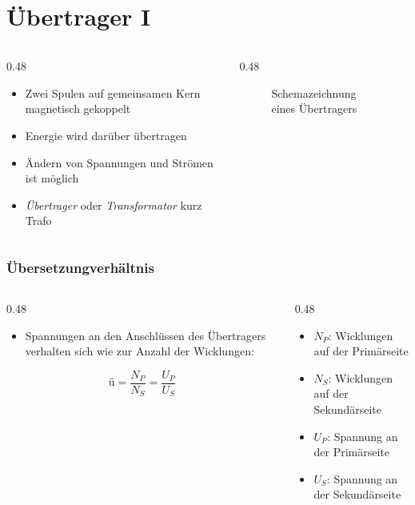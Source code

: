 
\section{Übertrager I}
\label{section:uebertrager_1}
\begin{frame}%

\begin{columns}
    \begin{column}{0.48\textwidth}
    \begin{itemize}
  \item Zwei Spulen auf gemeinsamen Kern magnetisch gekoppelt
  \item Energie wird darüber übertragen
  \item Ändern von Spannungen und Strömen ist möglich
  \item \emph{Übertrager} oder \emph{Transformator} kurz Trafo
  \end{itemize}

    \end{column}
   \begin{column}{0.48\textwidth}
       
\begin{figure}
    \caption{\scriptsize Schemazeichnung eines Übertragers}
    \label{e_uebertrager}
\end{figure}


   \end{column}
\end{columns}

\end{frame}

\begin{frame}
\frametitle{Übersetzungverhältnis}
\begin{columns}
    \begin{column}{0.48\textwidth}
    \begin{itemize}
  \item Spannungen an den Anschlüssen des Übertragers verhalten sich wie zur Anzahl der Wicklungen:
  \end{itemize}
    $$\text{ü} = \dfrac{N_P}{N_S} = \dfrac{U_P}{U_S}$$


    \end{column}
   \begin{column}{0.48\textwidth}
       \begin{itemize}
  \item $N_P$: Wicklungen auf der Primärseite
  \item $N_S$: Wicklungen auf der Sekundärseite
  \item $U_P$: Spannung an der Primärseite
  \item $U_S$: Spannung an der Sekundärseite
  \end{itemize}

   \end{column}
\end{columns}

\end{frame}

